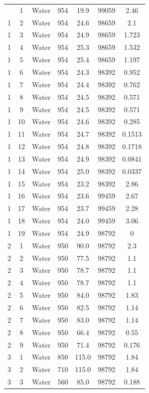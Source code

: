 \begin{longtable}[c]{|c|c|c|c|c|c|c|}
\hline
\endlastfoot
1 & 1 & Water & 954 & 19.9 & 99059 & 2.46 \\
1 & 2 & Water & 954 & 24.6 & 98659 & 2.1 \\
1 & 3 & Water & 954 & 24.9 & 98659 & 1.723 \\
1 & 4 & Water & 954 & 25.3 & 98659 & 1.532 \\
1 & 5 & Water & 954 & 25.4 & 98659 & 1.197 \\
1 & 6 & Water & 954 & 24.3 & 98392 & 0.952 \\
1 & 7 & Water & 954 & 24.4 & 98392 & 0.762 \\
1 & 8 & Water & 954 & 24.5 & 98392 & 0.571 \\
1 & 9 & Water & 954 & 24.5 & 98392 & 0.571 \\
1 & 10 & Water & 954 & 24.6 & 98392 & 0.285 \\
1 & 11 & Water & 954 & 24.7 & 98392 & 0.1513 \\
1 & 12 & Water & 954 & 24.8 & 98392 & 0.1718 \\
1 & 13 & Water & 954 & 24.9 & 98392 & 0.0841 \\
1 & 14 & Water & 954 & 25.0 & 98392 & 0.0337 \\
1 & 15 & Water & 954 & 23.2 & 98392 & 2.86 \\
1 & 16 & Water & 954 & 23.6 & 99459 & 2.67 \\
1 & 17 & Water & 954 & 23.7 & 99459 & 2.28 \\
1 & 18 & Water & 954 & 24.0 & 99459 & 3.06 \\
1 & 19 & Water & 954 & 24.9 & 98792 & 0 \\
2 & 1 & Water & 950 & 90.0 & 98792 & 2.3 \\
2 & 2 & Water & 950 & 77.5 & 98792 & 1.1 \\
2 & 3 & Water & 950 & 78.7 & 98792 & 1.1 \\
2 & 4 & Water & 950 & 78.7 & 98792 & 1.1 \\
2 & 5 & Water & 950 & 84.0 & 98792 & 1.83 \\
2 & 6 & Water & 950 & 82.5 & 98792 & 1.14 \\
2 & 7 & Water & 950 & 83.0 & 98792 & 1.14 \\
2 & 8 & Water & 950 & 66.4 & 98792 & 0.55 \\
2 & 9 & Water & 950 & 71.4 & 98792 & 0.176 \\
3 & 1 & Water & 850 & 115.0 & 98792 & 1.84 \\
3 & 2 & Water & 710 & 115.0 & 98792 & 1.84 \\
3 & 3 & Water & 560 & 85.0 & 98792 & 0.188 \\

\end{longtable}
